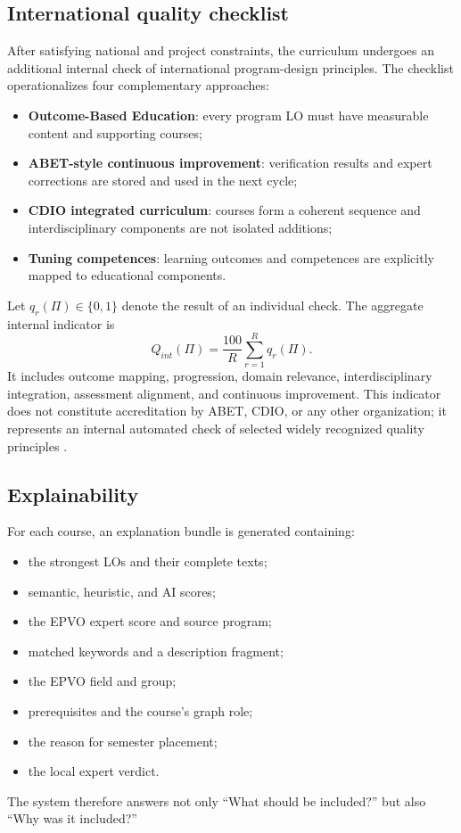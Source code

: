 \documentclass[twoside,11pt]{article}
\begin{document}
\subsection{International quality checklist}

After satisfying national and project constraints, the curriculum undergoes an additional internal check of international program-design principles. The checklist operationalizes four complementary approaches:
\begin{itemize}
  \item \textbf{Outcome-Based Education}: every program LO must have measurable content and supporting courses;
  \item \textbf{ABET-style continuous improvement}: verification results and expert corrections are stored and used in the next cycle;
  \item \textbf{CDIO integrated curriculum}: courses form a coherent sequence and interdisciplinary components are not isolated additions;
  \item \textbf{Tuning competences}: learning outcomes and competences are explicitly mapped to educational components.
\end{itemize}

Let $q_r(\Pi)\in\{0,1\}$ denote the result of an individual check. The aggregate internal indicator is
\begin{equation}
  Q_{int}(\Pi)=\frac{100}{R}\sum_{r=1}^{R}q_r(\Pi).
  \label{eq:international-quality}
\end{equation}
It includes outcome mapping, progression, domain relevance, interdisciplinary integration, assessment alignment, and continuous improvement. This indicator does not constitute accreditation by ABET, CDIO, or any other organization; it represents an internal automated check of selected widely recognized quality principles \cite{ABET2025,CDIO2022,Tuning2003}.

\subsection{Explainability}

For each course, an explanation bundle is generated containing:
\begin{itemize}
  \item the strongest LOs and their complete texts;
  \item semantic, heuristic, and AI scores;
  \item the EPVO expert score and source program;
  \item matched keywords and a description fragment;
  \item the EPVO field and group;
  \item prerequisites and the course's graph role;
  \item the reason for semester placement;
  \item the local expert verdict.
\end{itemize}
The system therefore answers not only ``What should be included?'' but also ``Why was it included?''
\end{document}
